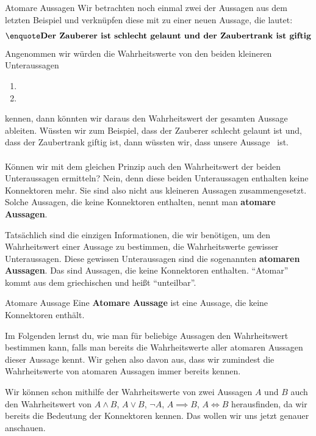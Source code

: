 \documentclass[../../main.tex]{subfiles}
\begin{document}
\begin{example}{Atomare Aussagen}
Wir betrachten noch einmal zwei der Aussagen aus dem letzten Beispiel und verknüpfen diese mit  zu einer neuen Aussage, die lautet:
\[\statement{Der Zauberer ist schlecht gelaunt und der Zaubertrank ist giftig}\]
Angenommen wir würden die Wahrheitswerte von den beiden kleineren Unteraussagen
\begin{enumerate}
    \item {}
    \item {}
\end{enumerate}
kennen, dann könnten wir daraus den Wahrheitswert der gesamten Aussage ableiten. Wüssten wir zum Beispiel, dass der Zauberer schlecht gelaunt ist und, dass der Zaubertrank giftig ist, dann wüssten wir, dass unsere Aussage  \wahr\  ist.
\\ \\
Können wir mit dem gleichen Prinzip auch den Wahrheitswert der beiden Unteraussagen ermitteln? Nein, denn diese beiden Unteraussagen enthalten keine Konnektoren mehr. Sie sind also nicht aus kleineren Aussagen zusammengesetzt. Solche Aussagen, die keine Konnektoren enthalten, nennt man \textbf{atomare Aussagen}.
\end{example}

Tatsächlich sind die einzigen Informationen, die wir benötigen, 
um den Wahrheitswert einer Aussage zu bestimmen, die Wahrheitswerte 
gewisser Unteraussagen. Diese gewissen Unteraussagen sind die sogenannten 
\textbf{atomaren Aussagen}. Das sind Aussagen, die keine Konnektoren enthalten. 
\enquote{Atomar} kommt aus dem griechischen und heißt \enquote{unteilbar}.

\begin{definition} {Atomare Aussage}
Eine \textbf{Atomare Aussage} ist eine Aussage, die keine Konnektoren enthält.
\end{definition}

Im Folgenden lernst du, wie man für beliebige Aussagen den Wahrheitswert 
bestimmen kann, falls man bereits die Wahrheitswerte aller atomaren Aussagen 
dieser Aussage kennt. Wir gehen also davon aus, dass wir zumindest die 
Wahrheitswerte von atomaren Aussagen immer bereits kennen.

Wir können schon mithilfe der Wahrheitswerte von zwei Aussagen $A$ und $B$ 
auch den 
Wahrheitswert von $A \land B$, $A \lor B$, $\lnot A$, $A \implies B$, $A \iff B$
herausfinden, da wir bereits die Bedeutung der Konnektoren kennen. Das wollen
wir uns jetzt genauer anschauen.
\end{document}
